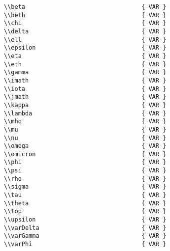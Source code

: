 \begin{verbatim}
\\beta                                 { VAR } 
\\beth                                 { VAR } 
\\chi                                  { VAR } 
\\delta                                { VAR } 
\\ell                                  { VAR }
\\epsilon                              { VAR } 
\\eta                                  { VAR } 
\\eth                                  { VAR } 
\\gamma                                { VAR } 
\\imath                                { VAR }
\\iota                                 { VAR }
\\jmath                                { VAR }
\\kappa                                { VAR }
\\lambda                               { VAR } 
\\mho                                  { VAR }
\\mu                                   { VAR } 
\\nu                                   { VAR } 
\\omega                                { VAR } 
\\omicron                              { VAR }
\\phi                                  { VAR } 
\\psi                                  { VAR } 
\\rho                                  { VAR } 
\\sigma                                { VAR } 
\\tau                                  { VAR } 
\\theta                                { VAR } 
\\top                                  { VAR }
\\upsilon                              { VAR } 
\\varDelta                             { VAR } 
\\varGamma                             { VAR } 
\\varPhi                               { VAR } 

\end{verbatim}
